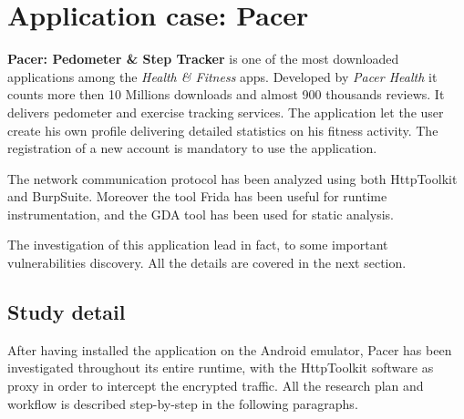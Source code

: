 \section{Application case: Pacer}
	\label{sec:pacer}
	
	\par \textbf{Pacer: Pedometer \& Step Tracker} is one of the most downloaded applications among the \textit{Health \& Fitness} apps. Developed by \textit{Pacer Health} it counts more then 10 Millions downloads and almost 900 thousands reviews. It delivers pedometer and exercise tracking services. The application let the user create his own profile delivering detailed statistics on his fitness activity. The registration of a new account is mandatory to use the application. \newline
	\par The network communication protocol has been analyzed using both HttpToolkit and BurpSuite. Moreover the tool Frida has been useful for runtime instrumentation, and the GDA tool has been used for static analysis. 
	\par The investigation of this application lead in fact, to some important vulnerabilities discovery. All the details are covered in the next section.
	
	\subsection{Study detail}	
		\par After having installed the application on the Android emulator, Pacer has been investigated throughout its entire runtime, with the HttpToolkit software as proxy in order to intercept the encrypted traffic.\newline
		All the research plan and workflow is described step-by-step in the following paragraphs.
		
